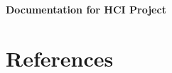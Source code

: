 \documentclass[12pt]{article}
\begin{document}
\begin{titlepage}

\begin{center}
{\huge {\bfseries Documentation for HCI Project}\\[1cm]}
\end{center}
\end{titlepage}


\begin{abstract}

\end{abstract}

\newpage







\newpage

\section{References}
\end{document}
